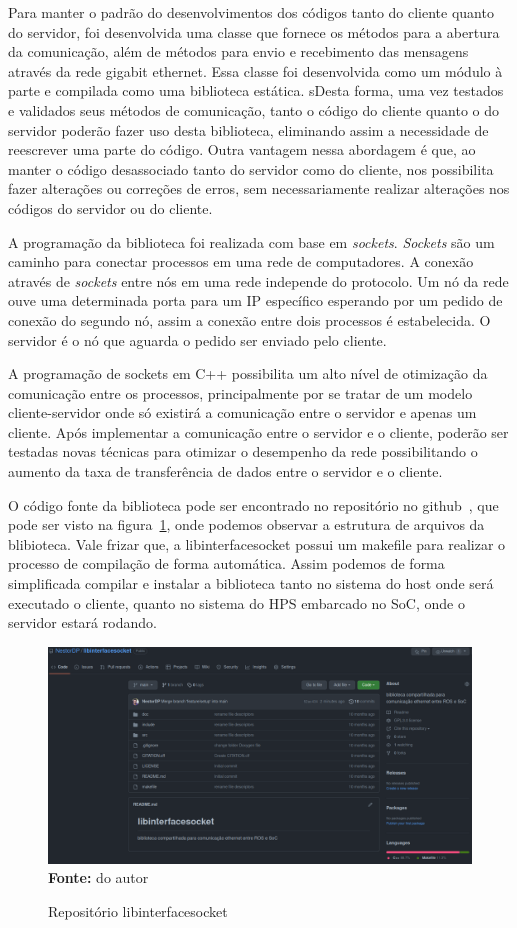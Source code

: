 Para manter o padrão do desenvolvimentos dos códigos tanto do cliente quanto do servidor, foi desenvolvida uma classe que fornece os métodos para a abertura da comunicação, além de métodos para envio e recebimento das mensagens através da rede gigabit ethernet. Essa classe foi desenvolvida como um módulo à parte e compilada como uma biblioteca estática. sDesta forma, uma vez testados e validados seus  métodos de comunicação, tanto o código do cliente quanto o do servidor poderão fazer uso desta biblioteca, eliminando assim a necessidade de reescrever uma parte
do código. Outra vantagem nessa abordagem é que, ao manter o código desassociado tanto do servidor como do cliente, nos possibilita fazer alterações ou correções de erros, sem necessariamente realizar alterações nos códigos do servidor ou do cliente.

A programação da biblioteca foi realizada com base em \textit{sockets}. \textit{Sockets} são um caminho para conectar processos em uma rede de computadores. A conexão através de \textit{sockets} entre nós em uma rede independe do protocolo. Um nó da rede ouve uma determinada porta para um IP específico esperando por um pedido de conexão do segundo nó, assim a conexão entre dois processos é estabelecida. O servidor é o nó que aguarda o pedido ser enviado pelo cliente.

A programação de sockets em C++ possibilita um alto nível de otimização da comunicação entre os processos, principalmente por se tratar de um modelo cliente-servidor onde só existirá a comunicação entre o servidor e apenas um cliente. Após implementar a comunicação entre o servidor e o cliente, poderão ser testadas novas técnicas para otimizar o desempenho da rede possibilitando o aumento da taxa de transferência de dados entre o servidor e o cliente.

O código fonte da biblioteca pode ser encontrado no repositório no github~\cite{Pereira-Neto-Biblioteca}, que pode ser visto na figura~\ref{fig:gitlib}, onde podemos observar a estrutura de arquivos da blibioteca. Vale frizar que, a libinterfacesocket possui um makefile para realizar o processo de compilação de forma automática. Assim podemos de forma simplificada compilar e instalar a biblioteca tanto no sistema do host onde será executado o cliente, quanto no sistema do HPS embarcado no SoC, onde o servidor estará rodando. 

\begin{figure}[ht]
	\caption{Repositório libinterfacesocket}
	\begin{center}
		\includegraphics[scale=0.26]{imagens/git_libinterfacesocket.png}\\
		{\small \textbf{Fonte:} do autor}
    \end{center}\label{fig:gitlib}
\end{figure}
